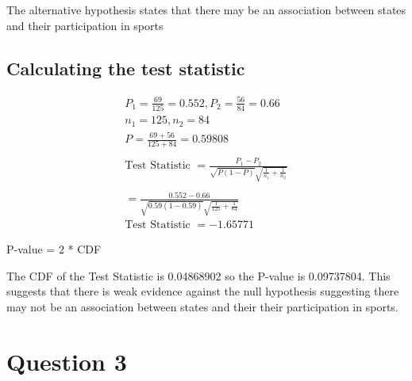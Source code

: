 \documentclass[oneside, a4paper]{article}
\begin{document}
The alternative hypothesis states that there may be an association between states and their participation in sports


\subsection{Calculating the test statistic}

\begin{equation*}
    \begin{split}
        P_1 = \frac{69}{125} = 0.552, P_2 = \frac{56}{84} = 0.66 \\
        n_1 = 125, n_2 = 84 \\
        P = \frac{69+56}{125+84} = 0.59808 \\ \\
        \text{Test Statistic } = \frac{P_1 - P_2}{\sqrt{P(1-P)} \sqrt{\frac{1}{n_1}+{\frac{1}{n_2}}}} \\ \\
        = \frac{0.552 - 0.66}{\sqrt{0.59(1-0.59)} \sqrt{\frac{1}{125}+{\frac{1}{84}}}} \\
        \text{Test Statistic } = -1.65771
    \end{split}
\end{equation*}

P-value = 2 * CDF 

The CDF of the Test Statistic is 0.04868902 so the P-value is 0.09737804. This suggests that there is weak evidence against the null hypothesis suggesting there may not be an association between states and their their participation in sports.


\newpage
\section{Question 3}
\end{document}
